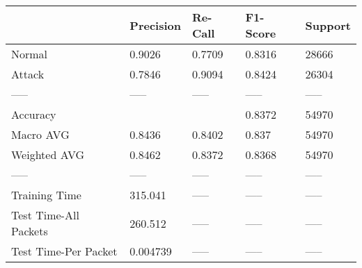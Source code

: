 \begin{tabular}{lllll}
\toprule
{} & Precision & Re-Call & F1-Score & Support \\
\midrule
Normal                &    0.9026 &  0.7709 &   0.8316 &   28666 \\
Attack                &    0.7846 &  0.9094 &   0.8424 &   26304 \\
-----                 &     ----- &   ----- &    ----- &   ----- \\
Accuracy              &           &         &   0.8372 &   54970 \\
Macro AVG             &    0.8436 &  0.8402 &    0.837 &   54970 \\
Weighted AVG          &    0.8462 &  0.8372 &   0.8368 &   54970 \\
-----                 &     ----- &   ----- &    ----- &   ----- \\
Training Time         &   315.041 &   ----- &    ----- &   ----- \\
Test Time-All Packets &   260.512 &   ----- &    ----- &   ----- \\
Test Time-Per Packet  &  0.004739 &   ----- &    ----- &   ----- \\
\bottomrule
\end{tabular}
